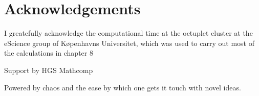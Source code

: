 \chapter*{Acknowledgements}



I greatefully acknowledge the computational time at the octuplet cluster at
the eScience group of Køpenhavns Universitet, which was used to carry out
most of the calculations in chapter 8

Support by HGS Mathcomp

Powered by chaos and the ease by which one gets it touch with novel ideas.
